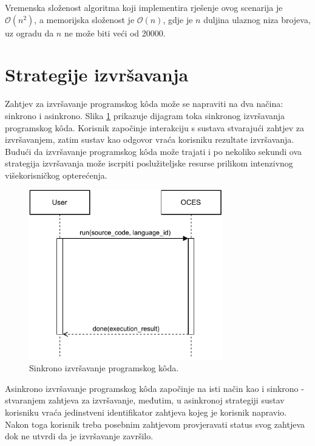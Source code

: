 \documentclass[times, utf8, diplomski]{fer}
\begin{document}
Vremenska složenost algoritma koji implementira rješenje ovog scenarija je $\mathcal{O}(n^2)$, a memorijska složenost je $\mathcal{O}(n)$, gdje je $n$ duljina ulaznog niza brojeva, uz ogradu da $n$ ne može biti veći od 20000.

\section{Strategije izvršavanja}
Zahtjev za izvršavanje programskog kôda može se napraviti na dva načina: sinkrono i asinkrono. Slika \ref{fig:sync-execution} prikazuje dijagram toka sinkronog izvršavanja programskog kôda. Korisnik započinje interakciju s sustava stvarajući zahtjev za izvršavanjem, zatim sustav kao odgovor vraća korisniku rezultate izvršavanja. Budući da izvršavanje programskog kôda može trajati i po nekoliko sekundi ova strategija izvršavanja može iscrpiti poslužiteljske resurse prilikom intenzivnog višekorisničkog opterećenja.

\begin{figure}[htb]
	\centering
	\includegraphics[width=0.75\textwidth]{images/sync-execution.pdf}
	\caption{
		Sinkrono izvršavanje programskog kôda.
	}
	\label{fig:sync-execution}
\end{figure}

Asinkrono izvršavanje programskog kôda započinje na isti način kao i sinkrono - stvaranjem zahtjeva za izvršavanje, međutim, u asinkronoj strategiji sustav korisniku vraća jedinstveni identifikator zahtjeva kojeg je korisnik napravio. Nakon toga korisnik treba posebnim zahtjevom provjeravati status svog zahtjeva dok ne utvrdi da je izvršavanje završilo.
\end{document}
